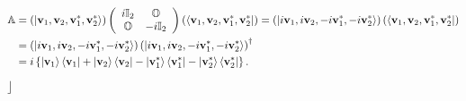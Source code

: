 \documentclass[aps,preprint]{revtex4}%
\begin{document}
\begin{align}
\mathbb{A}  &  =\left(  \left\vert \mathbf{v}_{1},\mathbf{v}_{2}%
,\mathbf{v}_{1}^{\ast},\mathbf{v}_{2}^{\ast}\right\rangle \right)  \left(
\begin{array}
[c]{cc}%
i\mathbb{I}_{2} & \mathbb{O}\\
\mathbb{O} & -i\mathbb{I}_{2}%
\end{array}
\right)  \left(  \left\langle \mathbf{v}_{1},\mathbf{v}_{2},\mathbf{v}%
_{1}^{\ast},\mathbf{v}_{2}^{\ast}\right\vert \right)  =\left(  \left\vert
i\mathbf{v}_{1},i\mathbf{v}_{2},-i\mathbf{v}_{1}^{\ast},-i\mathbf{v}_{2}%
^{\ast}\right\rangle \right)  \left(  \left\langle \mathbf{v}_{1}%
,\mathbf{v}_{2},\mathbf{v}_{1}^{\ast},\mathbf{v}_{2}^{\ast}\right\vert \right)
\\
&  =\left(  \left\vert i\mathbf{v}_{1},i\mathbf{v}_{2},-i\mathbf{v}_{1}^{\ast
},-i\mathbf{v}_{2}^{\ast}\right\rangle \right)  \left(  \left\vert
i\mathbf{v}_{1},i\mathbf{v}_{2},-i\mathbf{v}_{1}^{\ast},-i\mathbf{v}_{2}%
^{\ast}\right\rangle \right)  ^{\dagger}\\
&  =i\left\{  \left\vert \mathbf{v}_{1}\right\rangle \left\langle
\mathbf{v}_{1}\right\vert +\left\vert \mathbf{v}_{2}\right\rangle \left\langle
\mathbf{v}_{2}\right\vert -\left\vert \mathbf{v}_{1}^{\ast}\right\rangle
\left\langle \mathbf{v}_{1}^{\ast}\right\vert -\left\vert \mathbf{v}_{2}%
^{\ast}\right\rangle \left\langle \mathbf{v}_{2}^{\ast}\right\vert \right\}  .
\end{align}
$\rfloor$
\end{document}
